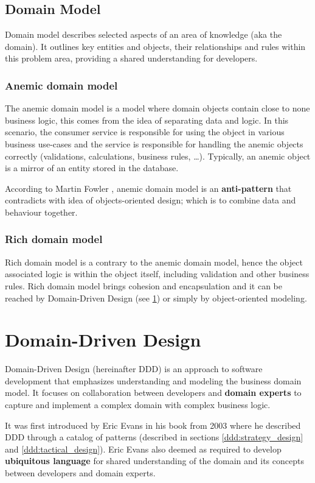 \subsection{Domain Model}
Domain model describes selected aspects of an area of knowledge (aka the domain). It outlines key entities and objects, their relationships and rules within this problem area, providing a shared understanding for developers.

\subsubsection*{Anemic domain model}
\label{theory:anemic_domain_model}
The anemic domain model is a model where domain objects contain close to none business logic, this comes from the idea of separating data and logic. In this scenario, the consumer service is responsible for using the object in various business use-cases and the service is responsible for handling the anemic objects correctly (validations, calculations, business rules, \dots). Typically, an anemic object is a mirror of an entity stored in the database.

According to Martin Fowler \cite{martin_fowler:anemic_domain}, anemic domain model is an \textbf{anti-pattern} that contradicts with idea of objects-oriented design; which is to combine data and behaviour together. 

\subsubsection*{Rich domain model}
\label{theory:rich_domain_model}
Rich domain model is a contrary to the anemic domain model, hence the object associated logic is within the object itself, including validation and other business rules. Rich domain model brings cohesion and encapsulation and it can be reached by Domain-Driven Design (see \ref{theory:ddd}) or simply by object-oriented modeling.

\newpage
\section{Domain-Driven Design}
\label{theory:ddd}
Domain-Driven Design (hereinafter DDD) is an approach to software development that emphasizes understanding and modeling the business domain model. It focuses on collaboration between developers and \textbf{domain experts} to capture and implement a complex domain with complex business logic.

It was first introduced by Eric Evans in his book from 2003 \cite{eric_evans:ddd} where he described DDD through a catalog of patterns (described in sections \ref{ddd:strategy_design} and \ref{ddd:tactical_design}). Eric Evans also deemed as required to develop \textbf{ubiquitous language} for shared understanding of the domain and its concepts between developers and domain experts.

